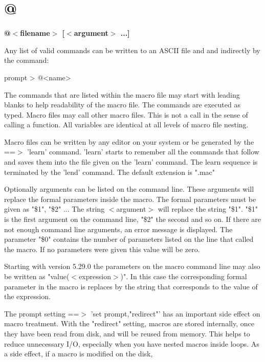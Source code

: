 \section{@}
{\bf @$ <$filename$> $ [$ <$argument$> $ ...] \par }
\par
\vspace{3pt}
Any list of valid commands can be written to an ASCII file and 
and indirectly by the command: 
\par
\begin{MacVerbatim}
prompt > @<name>
\end{MacVerbatim}
The commands that are listed within the macro file 
may start with leading blanks to help readability of 
the macro file. The commands are executed as typed. 
Macro files may call other macro files. This is not a call in 
the sense of calling a function. 
All variables are identical at all levels of macro file nesting. 
\par
Macro files can be written by any editor on your 
system or be generated by the ==$> $ 'learn' command. 'learn' starts to 
remember all the commands that follow and saves them into the file 
given on the 'learn' command. The learn sequence is terminated by 
the 'lend' command. The default extension is ".mac" 
\par
Optionally arguments can be listed on the command line. These arguments 
will replace the formal parameters inside the macro. The formal 
parameters must be given as "\$1", "\$2" ... The string $ <$argument$> $ will 
replace the string "\$1". "\$1" is the first argument on the command line, 
"\$2" the second and so on. If there are not enough command line arguments, 
an error message is displayed. 
The parameter "\$0" contains the number of parameters listed on the line 
that called the macro. If no parameters were given this value will be 
zero. 
\par
Starting with version 5.29.0 the parameters on the macro command line 
may also be written as "value($ <$expression$> $)". In this case the 
corresponding formal parameter in the macro is replaces by the 
string that corresponds to the value of the expression. 
\par
The prompt setting ==$> $ 'set prompt,"redirect"' has an important side 
effect on macro treatment. 
With the "redirect" setting, macros are stored internally, 
once they have been read from disk, and will be reused from memory. This 
helps to reduce unnecessary I/O, especially when you have nested macros 
inside loops. As a side effect, if a macro is modified on the disk, 
